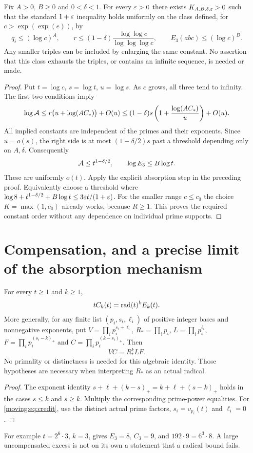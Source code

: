 \begin{theorem}\label{moving:thm:growing}
Fix $A>0$, $B\ge0$ and $0<\delta<1$. For every $\varepsilon>0$ there exists $K_{A,B,\delta,\varepsilon}>0$ such that the standard $1+\varepsilon$ inequality holds uniformly on the class defined, for $c>\exp(\exp(e))$, by
\begin{equation}\label{moving:eq:stratum}
 q_i\le(\log c)^A,\qquad
 r\le(1-\delta)\frac{\log\log c}{\log\log\log c},
 \qquad E_3(abc)\le(\log c)^B.
\end{equation}
Any smaller triples can be included by enlarging the same constant. No assertion that this class exhausts the triples, or contains an infinite sequence, is needed or made.
\end{theorem}
\begin{proof}
Put $t=\log c$, $s=\log t$, $u=\log s$. As $c$ grows, all three tend to infinity. The first two conditions imply
\[
 \log\mathcal A\le r\bigl(u+\log(AC_*)\bigr)+O(u)
 \le(1-\delta)s\left(1+\frac{\log(AC_*)}{u}\right)+O(u).
\]
All implied constants are independent of the primes and their exponents. Since $u=o(s)$, the right side is at most $(1-\delta/2)s$ past a threshold depending only on $A,\delta$. Consequently
\[
 \mathcal A\le t^{1-\delta/2},\qquad
 \log E_3\le B\log t.
\]
These are uniformly $o(t)$. Apply the explicit absorption step in the preceding proof. Equivalently choose a threshold where
$\log8+t^{1-\delta/2}+B\log t\le3\varepsilon t/(1+\varepsilon)$.
For the smaller range $c\le c_0$ the choice $K=\max(1,c_0)$ already works, because $R\ge1$. This proves the required constant order without any dependence on individual prime supports.
\end{proof}

\section{Compensation, and a precise limit of the absorption mechanism}
\begin{proposition}\label{moving:prop:credit}
For every $t\ge1$ and $k\ge1$,
\begin{equation}\label{moving:eq:credit}
 t C_k(t)=\operatorname{rad}(t)^k E_k(t).
\end{equation}
More generally, for any finite list $(p_i,s_i,\ell_i)$ of positive integer bases and nonnegative exponents, put $V=\prod_i p_i^{s_i+\ell_i}$, $R_*=\prod_i p_i$, $L=\prod_i p_i^{\ell_i}$, $F=\prod_i p_i^{(s_i-k)_+}$ and $C=\prod_i p_i^{(k-s_i)_+}$. Then
\[
 VC=R_*^k LF.
\]
No primality or distinctness is needed for this algebraic identity. Those hypotheses are necessary when interpreting $R_*$ as an actual radical.
\end{proposition}
\begin{proof}
The exponent identity
$s+\ell+(k-s)_+=k+\ell+(s-k)_+$ holds in the cases $s\le k$ and $s\ge k$. Multiply the corresponding prime-power equalities. For \eqref{moving:eq:credit}, use the distinct actual prime factors, $s_i=v_{p_i}(t)$ and $\ell_i=0$.
\end{proof}
For example $t=2^6\cdot3$, $k=3$, gives $E_3=8$, $C_3=9$, and $192\cdot9=6^3\cdot8$. A large uncompensated excess is not on its own a statement that a radical bound fails.

